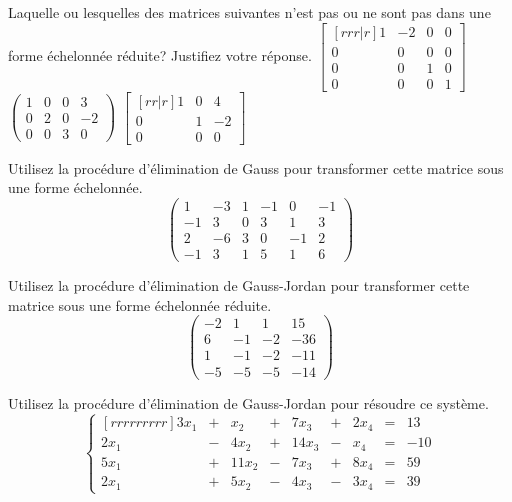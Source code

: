 \begin{TwoCol}
\begin{exercice}
 	Laquelle ou lesquelles des matrices suivantes n'est pas ou ne sont pas dans
	une forme échelonnée réduite?  Justifiez votre réponse.
	$\displaystyle
	\begin{bmatrix}[rrr|r]
	1 & -2 & 0 & 0 \\
	0 & 0 & 0 & 0 \\
	0 & 0 & 1 & 0 \\
	0 & 0 & 0 & 1
	\end{bmatrix}
	$
 $\displaystyle
	\begin{pmatrix}
	1 & 0 & 0 & 3 \\
	0 & 2 & 0 & -2 \\
	0 & 0 & 3 & 0
	\end{pmatrix}
	$
 $\displaystyle
	\begin{bmatrix}[rr|r]
	1 & 0 & 4 \\
	0 & 1 & -2\\
	0 & 0 & 0
	\end{bmatrix}
	$
 \end{exercice}
\pagebreak
\begin{exercice}
	Utilisez la procédure d'élimination de Gauss pour transformer cette matrice sous une forme échelonnée.
	\[
	\begin{pmatrix}
	1 & -3 & 1 & -1 & 0 & -1 \\
	-1 & 3 & 0 & 3 & 1 & 3 \\
	2 & -6 & 3 & 0 & -1 & 2 \\
	-1 & 3 & 1 & 5 & 1 & 6
	\end{pmatrix}
	\]
\end{exercice}

\begin{exercice}
	Utilisez la procédure d'élimination de Gauss-Jordan pour transformer cette matrice sous une forme échelonnée réduite.
	\[
	\begin{pmatrix}
	-2 & 1 & 1 & 15  \\
	6 & -1 & -2 & -36 \\
	1 & -1 & -2 & -11  \\
	-5 & -5 & -5 & -14
	\end{pmatrix}
	\]
\end{exercice}

\begin{exercice}
	Utilisez la procédure d'élimination de Gauss-Jordan pour résoudre ce système.
	\[
	\left\{
	\begin{matrix}[rrrrrrrrr]
	3x_1 &+&  x_2 &+& 7x_3 &+& 2x_4 &=& 13 \\
	2x_1 &-& 4x_2 &+&14x_3 &-&  x_4 &=& -10 \\
	5x_1 &+& 11x_2 &-& 7x_3 &+& 8x_4 &=& 59 \\
	2x_1 &+& 5x_2 &-& 4x_3 &-& 3x_4 &=& 39
	\end{matrix}
	\right.
	\]
\end{exercice}


\end{TwoCol}
